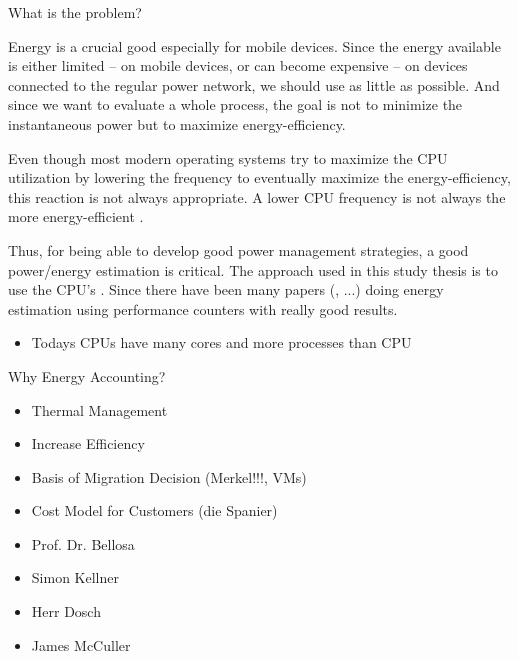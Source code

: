 
What is the problem?

Energy is a crucial good especially for mobile devices. Since the energy
available is either limited -- on mobile devices, or can become expensive --
on devices connected to the regular power network, we should use as little as
possible. And since we want to evaluate a whole process, the goal is not to
minimize the instantaneous power but to maximize energy-efficiency.

Even though most modern operating systems try to maximize the CPU utilization
by lowering the frequency \cite{snowdon2010operating} to eventually maximize the
energy-efficiency, this reaction is not always appropriate. A lower CPU
frequency is not always the more energy-efficient
\cite{weissel2002process,snowdon2010operating}.

Thus, for being able to develop good power management strategies, a good
power/energy estimation is critical. The approach used in this study thesis is
to use the CPU's .  Since
\cite{bellosa2000benefits} there have been many papers
(\cite{Bertran2010,bertran2010decomposable,kellner03tempcontrol,isci2003runtime,
weissel2002process}, ...) doing energy estimation using performance counters
with really good results.

\begin{itemize}

\item Todays CPUs have many cores and more processes than CPU

\end{itemize}

Why Energy Accounting?

\begin{itemize}

\item Thermal Management

\item Increase Efficiency

\item Basis of Migration Decision (Merkel!!!, VMs)

\item Cost Model for Customers (die Spanier)

\end{itemize}


\begin{itemize}

\item Prof. Dr. Bellosa

\item Simon Kellner

\item Herr Dosch

\item James McCuller

\end{itemize}

